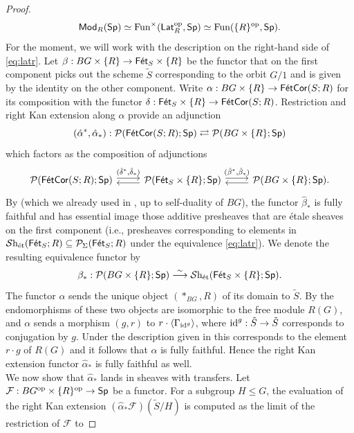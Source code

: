 \documentclass[reqno]{amsart}
\numberwithin{equation}{section}\theoremstyle{thms}
\theoremstyle{defn}
\newcommand{\cF}{\mathcal{F}}
\newcommand{\cP}{\mathcal{P}}
\newcommand{\tn}[1]{\textnormal{#1}}
\newcommand{\tsf}[1]{\textsf{\textup{#1}}}
\newcommand{\mcal}[1]{\mathcal{#1}}
\newcommand{\op}{\tn{op}}
\newcommand{\fun}{\tn{Fun}}
\newcommand{\psigma}{\cP_{\Sigma}}
\newcommand{\sheaves}{\mcal{S}\tn{h}}
\newcommand{\Mod}{\tsf{Mod}}
\newcommand{\spec}{\tsf{Sp}}
\newcommand{\fets}{\tsf{Fét}_S}
\newcommand{\corfets}[1]{\tsf{FétCor}(S;#1)}
\newcommand{\lat}{\tsf{Lat}}
\begin{document}
\begin{proof}
\begin{equation}\label{eq:latr}
\Mod_R(\spec) \simeq \fun^{\times}(\lat_R^\op,\spec) \simeq \fun(\{R\}^{\op},\spec).
\end{equation}
For the moment, we will work with the description on the right-hand side of \ref{eq:latr}. Let $\beta: BG \times \{R \} \to \fets \times \{R \}$ be the functor that on the first component picks out the scheme $\tilde{S}$ corresponding to the orbit $G/1$ and is given by the identity on the other component. Write $\alpha: BG \times \{R \} \to \corfets{R}$ for its composition with the functor $\delta: \tsf{Fét}_{S} \times \{R\} \to \tsf{FétCor}(S;R)$. Restriction and right Kan extension along $\alpha$ provide an adjunction 
$$(\hat{\alpha}^*,\hat{\alpha}_*): \cP(\corfets{R};\spec) \rightleftarrows \cP(BG \times \{R \};\spec)$$
which factors as the composition of adjunctions
\[\begin{tikzcd}
	{\cP(\corfets{R};\spec)} & {\cP(\fets \times \{R \};\spec)} & {\cP(BG \times \{R \};\spec).}
	\arrow["{(\hat{\delta}^*,\hat{\delta}_*)}", shift left, from=1-1, to=1-2]
	\arrow[shift left, from=1-2, to=1-1]
	\arrow["{(\hat{\beta}^*,\hat{\beta}_*)}", shift left, from=1-2, to=1-3]
	\arrow[shift left, from=1-3, to=1-2]
\end{tikzcd}\]
By \cite[Example 4.4]{cm21} (which we already used in , up to self-duality of $BG$), the functor $\hat{\beta}_*$ is fully faithful and has essential image those additive presheaves that are étale sheaves on the first component (i.e., presheaves corresponding to elements in $\sheaves_{\tn{ét}}(\fets;R) \subseteq \psigma(\fets;R)$ under the equivalence \ref{eq:latr}). We denote the resulting equivalence functor by 
$$\beta_*: \cP(BG \times \{R \};\spec) \stackrel{\sim}{\longrightarrow} \sheaves_{\tn{ét}}(\fets \times \{R \};\spec).$$
The functor $\alpha$ sends the unique object $(\ast_{BG},R)$ of its domain to $\tilde{S}$. By  the endomorphisms of these two objects are isomorphic to the free module $R(G)$, and $\alpha$ sends a morphism $(g,r)$ to $r \cdot \langle \Gamma_{{\tn{id}}^g}\rangle$, where ${\tn{id}}^g: \tilde{S} \to \tilde{S}$ corresponds to conjugation by $g$. Under the description given in  this corresponds to the element $r\cdot g$ of $R(G)$ and it follows that $\alpha$ is fully faithful. Hence the right Kan extension functor $\hat{\alpha}_*$ is fully faithful as well. \\
We now show that $\hat{\alpha}_*$ lands in sheaves with transfers. Let $\cF: BG^\op \times \{R \}^\op \to \spec$ be a functor. For a subgroup $H \leq G$, the evaluation of the right Kan extension $(\hat{\alpha}_*\cF)(\tilde{S}/H)$ is computed as the limit of the restriction of $\cF$ to

\end{proof}
\end{document}
